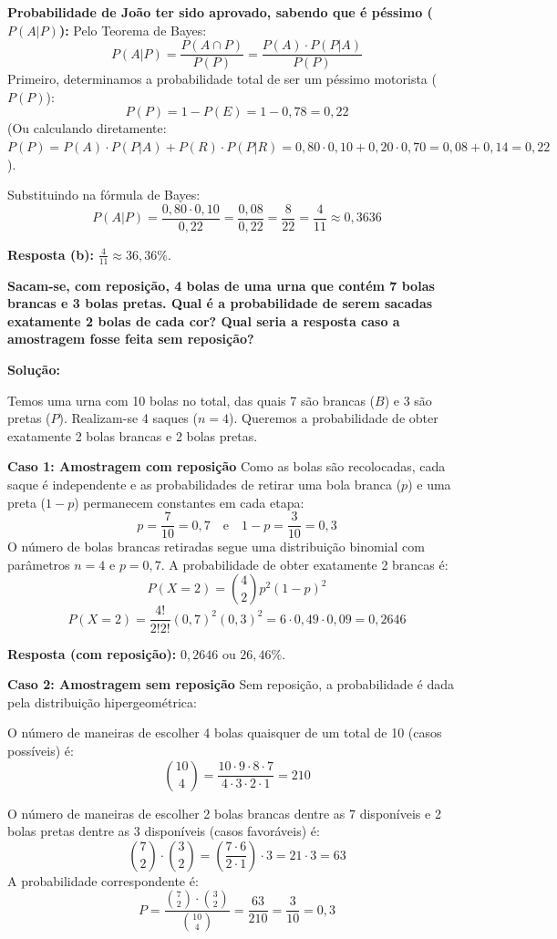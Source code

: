 \documentclass[a4paper,10pt,landscape,twocolumn]{article}  %
\let\oldenumerate\enumerate
\let\oldendenumerate\endenumerate
\renewenvironment{enumerate}{%
  \oldenumerate%
  \setlength{\itemsep}{1pt}%
  \setlength{\parskip}{0pt}%
  \setlength{\parsep}{0pt}%
  \setlength{\topsep}{2pt}%
  \setlength{\partopsep}{0pt}%
}{%
  \oldendenumerate%
}
\let\olditemize\itemize
\let\oldenditemize\enditemize
\renewenvironment{itemize}{%
  \olditemize%
  \setlength{\itemsep}{1pt}%
  \setlength{\parskip}{0pt}%
  \setlength{\parsep}{0pt}%
  \setlength{\topsep}{2pt}%
  \setlength{\partopsep}{0pt}%
}{%
  \oldenditemize%
}
\begin{document}
\begin{enumerate}
\begin{enumerate}
        \item \textbf{Probabilidade de João ter sido aprovado, sabendo que é péssimo ($P(A|P)$):}
        Pelo Teorema de Bayes:
        \[ P(A|P) = \frac{P(A \cap P)}{P(P)} = \frac{P(A) \cdot P(P|A)}{P(P)} \]
        Primeiro, determinamos a probabilidade total de ser um péssimo motorista ($P(P)$):
        \[ P(P) = 1 - P(E) = 1 - 0,78 = 0,22 \]
        (Ou calculando diretamente: $P(P) = P(A)\cdot P(P|A) + P(R)\cdot P(P|R) = 0,80\cdot 0,10 + 0,20\cdot 0,70 = 0,08 + 0,14 = 0,22$).
        
        Substituindo na fórmula de Bayes:
        \[ P(A|P) = \frac{0,80 \cdot 0,10}{0,22} = \frac{0,08}{0,22} = \frac{8}{22} = \frac{4}{11} \approx 0,3636 \]
        
        \textbf{Resposta (b):} $\frac{4}{11} \approx 36,36\%$.
    \end{enumerate}

    \item \textbf{Sacam-se, com reposição, 4 bolas de uma urna que contém 7 bolas brancas e 3 bolas pretas. Qual é a probabilidade de serem sacadas exatamente 2 bolas de cada cor? Qual seria a resposta caso a amostragem fosse feita sem reposição?}
    
    \textbf{Solução:}
    
    Temos uma urna com 10 bolas no total, das quais 7 são brancas ($B$) e 3 são pretas ($P$). Realizam-se 4 saques ($n = 4$). Queremos a probabilidade de obter exatamente 2 bolas brancas e 2 bolas pretas.
    
    \textbf{Caso 1: Amostragem com reposição}
    Como as bolas são recolocadas, cada saque é independente e as probabilidades de retirar uma bola branca ($p$) e uma preta ($1-p$) permanecem constantes em cada etapa:
    \[ p = \frac{7}{10} = 0,7 \quad \text{e} \quad 1-p = \frac{3}{10} = 0,3 \]
    O número de bolas brancas retiradas segue uma distribuição binomial com parâmetros $n = 4$ e $p = 0,7$. A probabilidade de obter exatamente 2 brancas é:
    \[ P(X = 2) = \binom{4}{2} p^2 (1-p)^{2} \]
    \[ P(X = 2) = \frac{4!}{2!2!} (0,7)^2 (0,3)^2 = 6 \cdot 0,49 \cdot 0,09 = 0,2646 \]
    
    \textbf{Resposta (com reposição):} $0,2646$ ou $26,46\%$.
    
    \textbf{Caso 2: Amostragem sem reposição}
    Sem reposição, a probabilidade é dada pela distribuição hipergeométrica:
    \begin{itemize}
        \item O número de maneiras de escolher 4 bolas quaisquer de um total de 10 (casos possíveis) é:
        \[ \binom{10}{4} = \frac{10 \cdot 9 \cdot 8 \cdot 7}{4 \cdot 3 \cdot 2 \cdot 1} = 210 \]
        \item O número de maneiras de escolher 2 bolas brancas dentre as 7 disponíveis e 2 bolas pretas dentre as 3 disponíveis (casos favoráveis) é:
        \[ \binom{7}{2} \cdot \binom{3}{2} = \left(\frac{7 \cdot 6}{2 \cdot 1}\right) \cdot 3 = 21 \cdot 3 = 63 \]
    \end{itemize}
    A probabilidade correspondente é:
    \[ P = \frac{\binom{7}{2} \cdot \binom{3}{2}}{\binom{10}{4}} = \frac{63}{210} = \frac{3}{10} = 0,3 \]
    

\end{enumerate}
\end{document}
